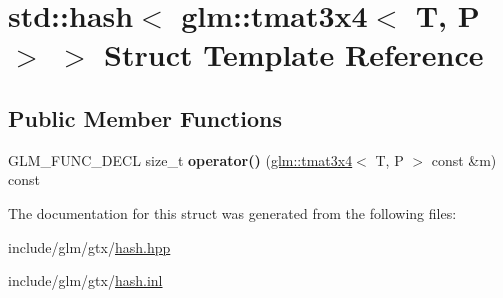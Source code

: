 \hypertarget{structstd_1_1hash_3_01glm_1_1tmat3x4_3_01T_00_01P_01_4_01_4}{}\section{std\+:\+:hash$<$ glm\+:\+:tmat3x4$<$ T, P $>$ $>$ Struct Template Reference}
\label{structstd_1_1hash_3_01glm_1_1tmat3x4_3_01T_00_01P_01_4_01_4}
\subsection*{Public Member Functions}
\begin{DoxyCompactItemize}
\item 
\mbox{\label{structstd_1_1hash_3_01glm_1_1tmat3x4_3_01T_00_01P_01_4_01_4_a483ef82653ebc8f75157832144d6d886}} 
G\+L\+M\+\_\+\+F\+U\+N\+C\+\_\+\+D\+E\+CL size\+\_\+t {\bfseries operator()} (\hyperlink{structglm_1_1tmat3x4}{glm\+::tmat3x4}$<$ T, P $>$ const \&m) const
\end{DoxyCompactItemize}


The documentation for this struct was generated from the following files\+:\begin{DoxyCompactItemize}
\item 
include/glm/gtx/\hyperlink{hash_8hpp}{hash.\+hpp}\item 
include/glm/gtx/\hyperlink{hash_8inl}{hash.\+inl}\end{DoxyCompactItemize}
